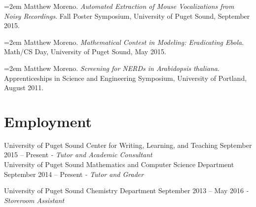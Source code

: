 \documentclass[letter]{res}
\begin{document}
\begin{resume}
\vspace {-3.5 mm}
\hangindent=2em
Matthew Moreno. \textit{Automated Extraction of Mouse Vocalizations from Noisy
Recordings}. Fall Poster Symposium, University of Puget Sound, September
2015.

\vspace {-3.5 mm}
\hangindent=2em
Matthew Moreno. \textit{Mathematical Contest in Modeling: Eradicating Ebola}.
Math/CS Day, University of Puget Sound, May 2015.

\vspace {-3.5 mm}
\hangindent=2em
Matthew Moreno. \textit{Screening for NERDs in Arabidopsis thaliana}. Apprenticeships in Science and Engineering Symposium, University of Portland, August 2011.

 \vspace {-3.5 mm}
 
\section{Employment}
University of Puget Sound Center for Writing, Learning, and Teaching \hfill September 2015 – Present \newline 
\textit{ - Tutor and Academic Consultant}  \\
University of Puget Sound Mathematics and Computer Science Department \hfill  September 2014 – Present \newline
\textit{- Tutor and Grader} \\
  \vspace{-4.5mm}
    \vspace{-3.5mm}
    
University of Puget Sound Chemistry Department \hfill September 2013 – May 2016 \newline 
\textit{- Storeroom Assistant} \\
  \vspace{-4.5mm}
    \vspace{-3.5mm}



\end{resume}
\end{document}
